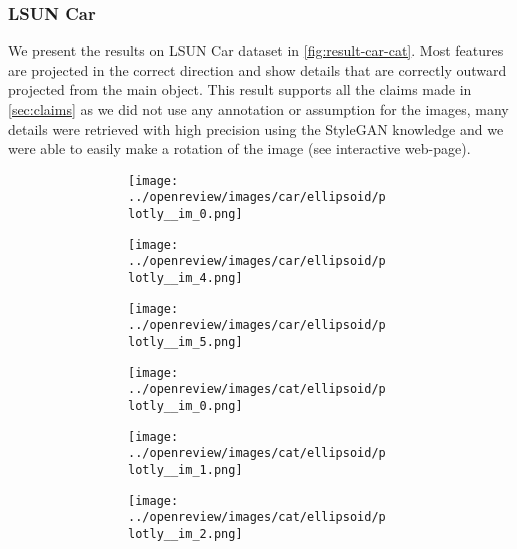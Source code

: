 \subsubsection{LSUN Car}
We present the results on LSUN Car dataset in \autoref{fig:result-car-cat}. Most features are projected in the correct direction and show details that are correctly outward projected from the main object. This result supports all the claims made in \autoref{sec:claims} as we did not use any annotation or assumption for the images, many details were retrieved with high precision using the StyleGAN knowledge and we were able to easily make a rotation of the image (see interactive web-page).
\begin{figure}[h]
    \centering
    \begin{subfigure}{0.80\textwidth}
        \begin{subfigure}{0.16\textwidth}
            \centering
            \texttt{[image: ../openreview/images/car/ellipsoid/plotly\_\_im\_0.png]}
        \end{subfigure}
        \begin{subfigure}{0.16\textwidth}
            \centering
            \texttt{[image: ../openreview/images/car/ellipsoid/plotly\_\_im\_4.png]}
        \end{subfigure}
        \begin{subfigure}{0.16\textwidth}
            \centering
            \texttt{[image: ../openreview/images/car/ellipsoid/plotly\_\_im\_5.png]}
        \end{subfigure}
        \begin{subfigure}{0.16\textwidth}
            \centering
            \texttt{[image: ../openreview/images/cat/ellipsoid/plotly\_\_im\_0.png]}
        \end{subfigure}
        \begin{subfigure}{0.16\textwidth}
            \centering
            \texttt{[image: ../openreview/images/cat/ellipsoid/plotly\_\_im\_1.png]}
        \end{subfigure}
        \begin{subfigure}{0.16\textwidth}
            \centering
            \texttt{[image: ../openreview/images/cat/ellipsoid/plotly\_\_im\_2.png]}
        \end{subfigure}
    

\end{subfigure}
\end{figure}
